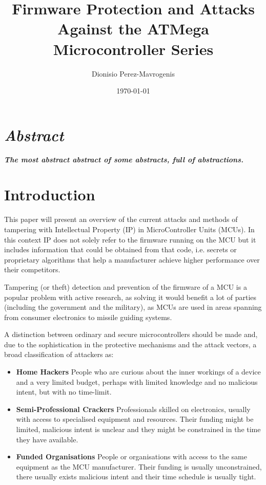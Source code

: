 \documentclass[10pt,a4paper,twocolumn]{article}
\author{Dionisio Perez-Mavrogenis}
\title{Firmware Protection and Attacks Against the ATMega Microcontroller Series}
\date{\today}
\begin{document}
	\maketitle
	
\section*{\emph{Abstract}}
	\textbf{\emph{The most abstract abstract of some abstracts, full of abstractions.}}
	

\section{Introduction}
	This paper will present an overview of the current attacks and methods of tampering with Intellectual Property (IP) in MicroController Units (MCUs). In this context IP does not solely refer to the firmware running on the MCU but it includes information that could be obtained from that code, i.e. secrets or proprietary algorithms that help a manufacturer achieve higher performance over their competitors.
	
	Tampering (or theft) detection and prevention of the firmware of a MCU is a popular problem with active research, as solving it would benefit a lot of parties (including the government and the military), as MCUs are used in areas spanning from consumer electronics to missile guiding systems.
	
	A distinction between ordinary and secure microcontrollers should be made\citep{website:scorobogatov_breaking_copy_protection} and, due to the sophistication in the protective mechanisms and the attack vectors, a broad classification of attackers as\cite{anderson:cautionary_note}:
		\begin{itemize}
			\item \textbf{Home Hackers} People who are curious about the inner workings of a device and a very limited budget, perhaps with limited knowledge and no malicious intent, but with no time-limit.\\
			\item \textbf{Semi-Professional Crackers} Professionals skilled on electronics, usually with access to specialised equipment and resources. Their funding might be limited, malicious intent is unclear and they might be constrained in the time they have available.\\
			\item \textbf{Funded Organisations} People or organisations with access to the same equipment as the MCU manufacturer. Their funding is usually unconstrained, there usually exists malicious intent and their time schedule is usually tight.
		\end{itemize}
	
\end{document}
